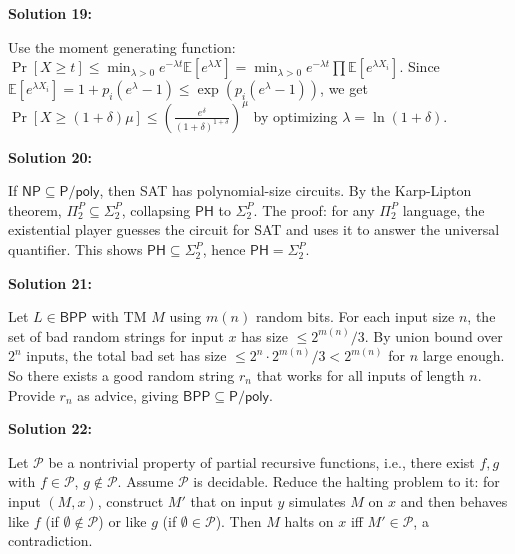 \documentclass[12pt,a4paper]{exam}
\begin{document}
\vspace{0.5cm}

\textbf{Solution 19:}

Use the moment generating function: $\Pr[X \geq t] \leq \min_{\lambda > 0} e^{-\lambda t} \mathbb{E}[e^{\lambda X}] = \min_{\lambda > 0} e^{-\lambda t} \prod \mathbb{E}[e^{\lambda X_i}]$. Since $\mathbb{E}[e^{\lambda X_i}] = 1 + p_i(e^\lambda - 1) \leq \exp(p_i(e^\lambda - 1))$, we get $\Pr[X \geq (1+\delta)\mu] \leq (\frac{e^\delta}{(1+\delta)^{1+\delta}})^\mu$ by optimizing $\lambda = \ln(1+\delta)$.

\vspace{0.5cm}

\textbf{Solution 20:}

If $\mathsf{NP} \subseteq \mathsf{P}/\mathsf{poly}$, then SAT has polynomial-size circuits. By the Karp-Lipton theorem, $\Pi_2^P \subseteq \Sigma_2^P$, collapsing $\mathsf{PH}$ to $\Sigma_2^P$. The proof: for any $\Pi_2^P$ language, the existential player guesses the circuit for SAT and uses it to answer the universal quantifier. This shows $\mathsf{PH} \subseteq \Sigma_2^P$, hence $\mathsf{PH} = \Sigma_2^P$.

\vspace{0.5cm}

\textbf{Solution 21:}

Let $L \in \mathsf{BPP}$ with TM $M$ using $m(n)$ random bits. For each input size $n$, the set of bad random strings for input $x$ has size $\leq 2^{m(n)}/3$. By union bound over $2^n$ inputs, the total bad set has size $\leq 2^n \cdot 2^{m(n)}/3 < 2^{m(n)}$ for $n$ large enough. So there exists a good random string $r_n$ that works for all inputs of length $n$. Provide $r_n$ as advice, giving $\mathsf{BPP} \subseteq \mathsf{P}/\mathsf{poly}$.

\vspace{0.5cm}

\textbf{Solution 22:}

Let $\mathcal{P}$ be a nontrivial property of partial recursive functions, i.e., there exist $f,g$ with $f \in \mathcal{P}$, $g \notin \mathcal{P}$. Assume $\mathcal{P}$ is decidable. Reduce the halting problem to it: for input $(M,x)$, construct $M'$ that on input $y$ simulates $M$ on $x$ and then behaves like $f$ (if $\emptyset \notin \mathcal{P}$) or like $g$ (if $\emptyset \in \mathcal{P}$). Then $M$ halts on $x$ iff $M' \in \mathcal{P}$, a contradiction.

\vspace{0.5cm}
\end{document}
